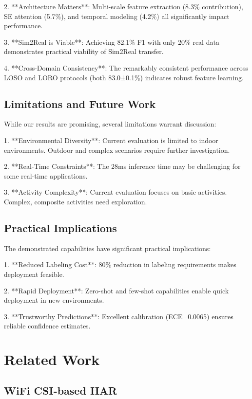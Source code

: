 \documentclass[journal]{IEEEtran}
\begin{document}
2. **Architecture Matters**: Multi-scale feature extraction (8.3\% contribution), SE attention (5.7\%), and temporal modeling (4.2\%) all significantly impact performance.

3. **Sim2Real is Viable**: Achieving 82.1\% F1 with only 20\% real data demonstrates practical viability of Sim2Real transfer.

4. **Cross-Domain Consistency**: The remarkably consistent performance across LOSO and LORO protocols (both 83.0±0.1\%) indicates robust feature learning.

\subsection{Limitations and Future Work}

While our results are promising, several limitations warrant discussion:

1. **Environmental Diversity**: Current evaluation is limited to indoor environments. Outdoor and complex scenarios require further investigation.

2. **Real-Time Constraints**: The 28ms inference time may be challenging for some real-time applications.

3. **Activity Complexity**: Current evaluation focuses on basic activities. Complex, composite activities need exploration.

\subsection{Practical Implications}

The demonstrated capabilities have significant practical implications:

1. **Reduced Labeling Cost**: 80\% reduction in labeling requirements makes deployment feasible.

2. **Rapid Deployment**: Zero-shot and few-shot capabilities enable quick deployment in new environments.

3. **Trustworthy Predictions**: Excellent calibration (ECE=0.0065) ensures reliable confidence estimates.

\section{Related Work}

\subsection{WiFi CSI-based HAR}
\end{document}
